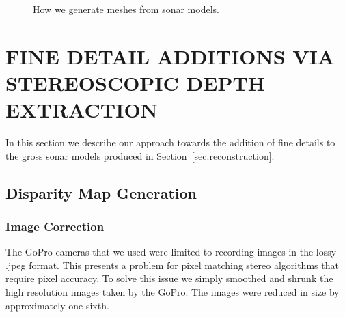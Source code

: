 \documentclass[a4paper,twoside]{article}
\begin{document}
\begin{figure*}[!ht]
   \vspace{-0.2cm}
   \caption{How we generate meshes from sonar models.}
  \label{fig:meshgen}
 \end{figure*}

\section{\uppercase{Fine Detail Additions Via Stereoscopic Depth Extraction}}
\label{sec:detail}

\noindent In this section we describe our approach towards the addition of fine details to the gross sonar models produced in Section~\ref{sec:reconstruction}. 


\subsection{Disparity Map Generation}
\subsubsection{Image Correction}
\label{subsec:image_correction}
The GoPro cameras that we used were limited to recording images in the lossy .jpeg format.
This presents a problem for pixel matching stereo algorithms that require pixel accuracy.  
To solve this issue we simply smoothed and shrunk the high resolution images taken by the GoPro.  
The images were reduced in size by approximately one sixth.  
\end{document}
